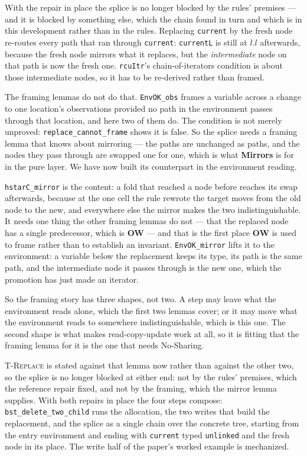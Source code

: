 With the repair in place the splice is no longer blocked by the rules'
premises --- and it is blocked by something else, which the chain found in turn
and which is in this development rather than in the rules.  Replacing
\texttt{current} by the fresh node re-routes every path that ran through
\texttt{current}: \texttt{currentL} is still at $l.l$ afterwards, because the
fresh node mirrors what it replaces, but the \emph{intermediate} node on that
path is now the fresh one.  \texttt{rcuItr}'s chain-of-iterators condition is
about those intermediate nodes, so it has to be re-derived rather than framed.

The framing lemmas do not do that.  \texttt{EnvOK\_obs} frames a variable across
a change to one location's observations provided no path in the environment
passes through that location, and here two of them do.  The condition is not
merely unproved: \texttt{replace\_cannot\_frame} shows it is false.  So the
splice needs a framing lemma that knows about mirroring --- the paths are
unchanged as paths, and the nodes they pass through are swapped one for one,
which is what \textbf{Mirrors} is for in the pure layer.  We have now built its
counterpart in the environment reading.

\texttt{hstarC\_mirror} is the content: a fold that reached a node before
reaches its swap afterwards, because at the one cell the rule rewrote the target
moves from the old node to the new, and everywhere else the mirror makes the two
indistinguishable.  It needs one thing the other framing lemmas do not --- that
the replaced node has a single predecessor, which is \textbf{OW} --- and that is
the first place \textbf{OW} is used to frame rather than to establish an
invariant.  \texttt{EnvOK\_mirror} lifts it to the environment: a variable below
the replacement keeps its type, its path is the same path, and the intermediate
node it passes through is the new one, which the promotion has just made an
iterator.

So the framing story has three shapes, not two.  A step may leave what the
environment reads alone, which the first two lemmas cover; or it may move what
the environment reads to somewhere indistinguishable, which is this one.  The
second shape is what makes read-copy-update work at all, so it is fitting that
the framing lemma for it is the one that needs No-Sharing.

\textsc{T-Replace} is stated against that lemma now rather than against the
other two, so the splice is no longer blocked at either end: not by the rules'
premises, which the reference repair fixed, and not by the framing, which the
mirror lemma supplies.  With both repairs in place the four steps compose:
\texttt{bst\_delete\_two\_child} runs the allocation, the two writes that build
the replacement, and the splice as a single chain over the concrete tree,
starting from the entry environment and ending with \texttt{current} typed
\texttt{unlinked} and the fresh node in its place.  The write half of the
paper's worked example is mechanized.

